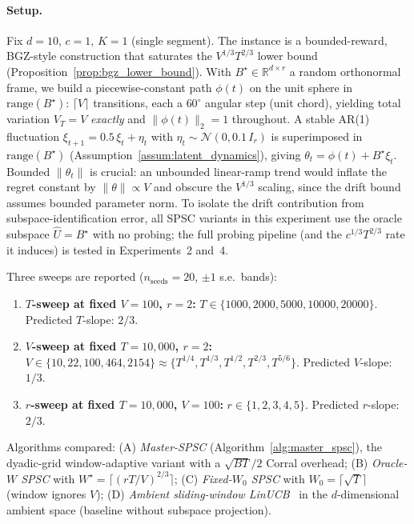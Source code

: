 \documentclass[11pt]{article}
\newcommand{\R}{\mathbb{R}}
\newcommand{\range}{\mathrm{range}}
\begin{document}
\paragraph{Setup.}
Fix $d{=}10$, $c{=}1$, $K{=}1$ (single segment).  The instance is a
bounded-reward, BGZ-style construction that saturates the $V^{1/3}T^{2/3}$
lower bound (Proposition~\ref{prop:bgz_lower_bound}).  With
$B^{\star}\in\R^{d\times r}$ a random orthonormal frame, we build a
piecewise-constant path $\phi(t)$ on the unit sphere in $\range(B^{\star})$:
$\lceil V\rceil$ transitions, each a $60^\circ$ angular step (unit chord),
yielding total variation $V_T{=}V$ \emph{exactly} and $\|\phi(t)\|_2{=}1$
throughout.  A stable AR(1) fluctuation
$\xi_{t+1}{=}0.5\,\xi_t+\eta_t$ with $\eta_t\sim\mathcal N(0,0.1\,I_r)$
is superimposed in $\range(B^{\star})$ (Assumption~\ref{assum:latent_dynamics}),
giving $\theta_t{=}\phi(t)+B^{\star}\xi_t$.  Bounded
$\|\theta_t\|$ is crucial: an unbounded linear-ramp trend would inflate the
regret constant by $\|\theta\|\propto V$ and obscure the $V^{1/3}$ scaling,
since the drift bound assumes bounded parameter norm.  To isolate the drift
contribution from subspace-identification error, all SPSC variants in this
experiment use the oracle subspace $\widehat U{=}B^{\star}$ with no probing;
the full probing pipeline (and the $c^{1/3}T^{2/3}$ rate it induces) is
tested in Experiments~2 and~4.

Three sweeps are reported ($n_{\mathrm{seeds}}{=}20$, $\pm 1$ s.e.\ bands):
\begin{enumerate}[label=(\alph*),leftmargin=1.4em,nosep]
\item \textbf{$T$-sweep at fixed $V{=}100$, $r{=}2$:}
$T\in\{1000,2000,5000,10000,20000\}$.  Predicted $T$-slope: $2/3$.
\item \textbf{$V$-sweep at fixed $T{=}10{,}000$, $r{=}2$:}
$V\in\{10,22,100,464,2154\}\approx\{T^{1/4},T^{1/3},T^{1/2},T^{2/3},T^{5/6}\}$.
Predicted $V$-slope: $1/3$.
\item \textbf{$r$-sweep at fixed $T{=}10{,}000$, $V{=}100$:}
$r\in\{1,2,3,4,5\}$.  Predicted $r$-slope: $2/3$.
\end{enumerate}
Algorithms compared:
(A) \emph{Master-SPSC} (Algorithm~\ref{alg:master_spsc}), the dyadic-grid
window-adaptive variant with a $\sqrt{BT}/2$ Corral overhead;
(B) \emph{Oracle-$W$ SPSC} with $W^\star{=}\lceil(rT/V)^{2/3}\rceil$;
(C) \emph{Fixed-$W_0$ SPSC} with $W_0{=}\lceil\sqrt T\rceil$ (window ignores
$V$);
(D) \emph{Ambient sliding-window LinUCB}~\citep{russac2019weighted}
in the $d$-dimensional ambient space (baseline without subspace projection).
\end{document}
